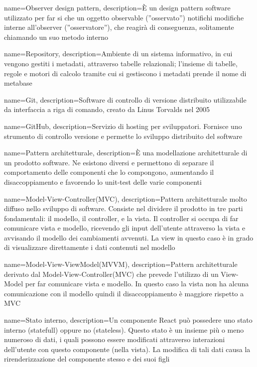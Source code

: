 {
  name={Observer design pattern},
  description={È un design pattern software utilizzato per far si che un oggetto observable\glo{} (”osservato”) notifichi modifiche interne all'observer\glo{} (”osservatore”), che reagirà di conseguenza, solitamente chiamando un suo metodo interno}
}

{
  name={Repository},
  description={Ambiente di un sistema informativo, in cui vengono gestiti i metadati, attraverso tabelle relazionali; l'insieme di tabelle, regole e motori di calcolo tramite cui si gestiscono i metadati prende il nome di metabase}
}

{
  name={Git},
  description={Software di controllo di versione distribuito utilizzabile da interfaccia a riga di comando, creato da Linus Torvalds nel 2005}
}

{
  name={GitHub},
  description={Servizio di hosting per sviluppatori. Fornisce uno strumento di controllo versione e permette lo sviluppo distribuito del software}
}

{
  name={Pattern architetturale},
  description={È una modellazione architetturale di un prodotto software. Ne esistono diversi e permettono di separare il comportamento delle componenti che lo compongono, aumentando il disaccoppiamento e favorendo lo unit-test delle varie componenti}
}

{
  name={Model-View-Controller(MVC)},
  description={Pattern architetturale molto diffuso nello sviluppo di software. Consiste nel dividere il prodotto in tre parti fondamentali: il modello, il controller, e la vista. Il controller si occupa di far comunicare vista e modello, ricevendo gli input dell'utente attraverso la vista e avvisando il modello dei cambiamenti avvenuti. La view in questo caso è in grado di visualizzare direttamente i dati contenuti nel modello}
}

{
  name={Model-View-ViewModel(MVVM)},
  description={Pattern architetturale derivato dal Model-View-Controller(MVC)\glo{} che prevede l'utilizzo di un View-Model per far comunicare vista e modello. In questo caso la vista non ha alcuna comunicazione con il modello quindi il disaccoppiamento è maggiore rispetto a MVC}
}

{
  name={Stato interno},
  description={Un componente React può possedere uno stato interno (statefull) oppure no (stateless). Questo stato è un insieme più o meno numeroso di dati, i quali possono essere modificati attraverso interazioni dell'utente con questo componente (nella vista). La modifica di tali dati causa la rirenderizzazione del componente stesso e dei suoi figli}
}

